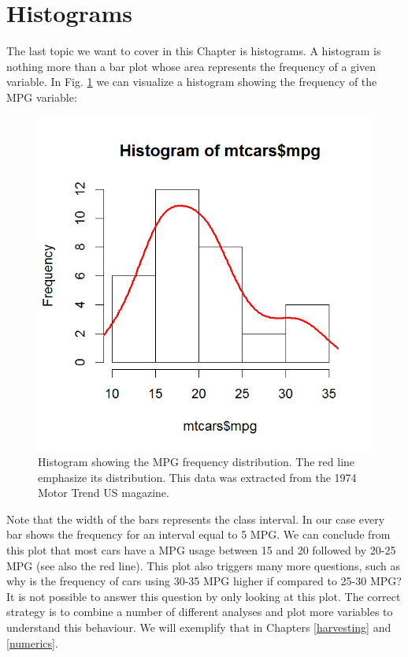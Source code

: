 \section{Histograms}

The last topic we want to cover in this Chapter is histograms. A histogram is nothing more than a bar plot whose area represents the frequency of a given variable. In Fig. \ref{fig:histch2} we can visualize a histogram showing the frequency of the MPG variable:

\begin{figure}[h]
	\begin{center}
			\includegraphics[scale=0.7]{Parts/ch2/histch2}
	\end{center}
	\caption{Histogram showing the MPG frequency distribution. The red line emphasize its distribution. This data was extracted from the 1974 Motor Trend US magazine.}
	\label{fig:histch2}
\end{figure} 

\newpage

Note that the width of the bars represents the class interval. In our case every bar shows the frequency for an interval equal to 5 MPG. We can conclude from this plot that most cars have a MPG usage between 15 and 20 followed by 20-25 MPG (see also the red line). This plot also triggers many more questions, such as why is the frequency of cars using 30-35 MPG higher if compared to 25-30 MPG? It is not  possible to answer this question by only looking at this plot. The correct strategy is to combine a number of different analyses and plot more variables to understand this behaviour. We will exemplify that in Chapters \ref{harvesting} and \ref{numerics}.